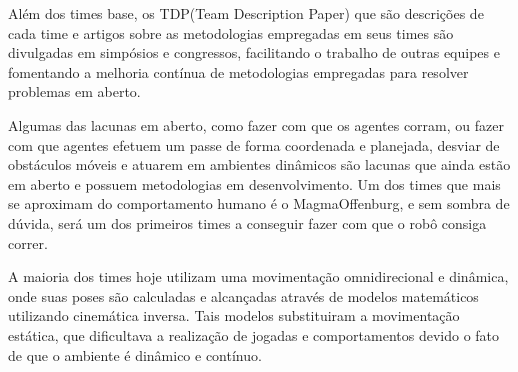 Além dos times base, os TDP(Team Description Paper) que são descrições de cada time e artigos sobre as metodologias empregadas
em seus times são divulgadas em simpósios e congressos, facilitando o trabalho de outras equipes e fomentando a melhoria contínua
de metodologias empregadas para resolver problemas em aberto.

Algumas das lacunas em aberto, como fazer com que os agentes corram, ou fazer com que agentes efetuem um passe de forma coordenada
e planejada, desviar de obstáculos móveis e atuarem em ambientes dinâmicos são lacunas que ainda estão em aberto e possuem  
metodologias em desenvolvimento. Um dos times que mais se aproximam do comportamento humano é o MagmaOffenburg, e sem sombra de dúvida, 
será um dos primeiros times a conseguir fazer com que o robô consiga correr.

A maioria dos times hoje utilizam uma movimentação omnidirecional e dinâmica, onde suas poses são calculadas e alcançadas através de 
modelos matemáticos utilizando cinemática inversa. Tais modelos substituiram a movimentação estática, que dificultava a realização de 
jogadas e comportamentos devido o fato de que o ambiente é dinâmico e contínuo. 


   




